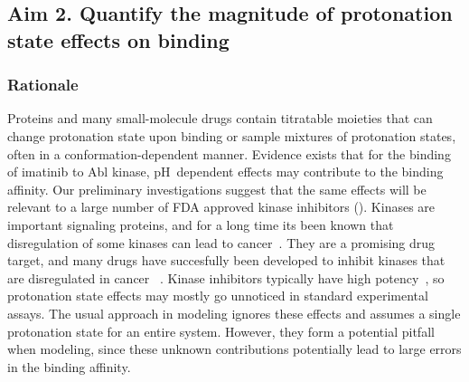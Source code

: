 \documentclass[10pt,final]{article}
\newcommand{\pH}{p$\mathrm{H}$\ }
\begin{document}
\subsection*{Aim 2. Quantify the magnitude of protonation state effects on binding}
\subsubsection*{Rationale}
Proteins and many small-molecule drugs contain titratable moieties that can change protonation state upon binding or sample mixtures of protonation states, often in a conformation-dependent manner.
%
Evidence exists that for the binding of imatinib to Abl kinase, \pH dependent effects may contribute to the binding affinity\cite{Szakacs2005a, Seeliger2007a, Lin2013a}. 
%
Our preliminary investigations suggest that the same effects will be relevant to a large number of FDA approved kinase inhibitors ().
%
Kinases are important signaling proteins, and for a long time its been known that disregulation of some kinases can lead to cancer~\autocite{Levinson1978a,Vivanco2002a}.
%
They are a promising drug target, and many drugs have succesfully been developed to inhibit kinases that are disregulated in cancer ~\autocite{Baselga2006a,Garber2006a,OHare2011a}.
%
Kinase inhibitors typically have high potency~\autocite{Knight2005a}, so protonation state effects may mostly go unnoticed in standard experimental assays.
%
The usual approach in modeling ignores these effects and assumes a single protonation state for an entire system.
%
However, they form a potential pitfall when modeling, since these unknown contributions potentially lead to large errors in the binding affinity.
\end{document}
